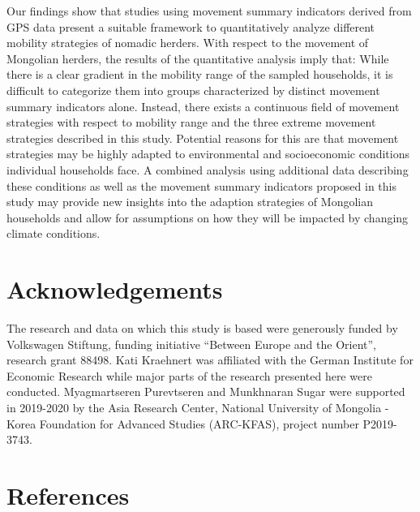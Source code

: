 \documentclass[]{elsarticle} %
\begin{document}
Our findings show that studies using movement summary indicators derived
from GPS data present a suitable framework to quantitatively analyze
different mobility strategies of nomadic herders. With respect to the
movement of Mongolian herders, the results of the quantitative analysis
imply that: While there is a clear gradient in the mobility range of the
sampled households, it is difficult to categorize them into groups
characterized by distinct movement summary indicators alone. Instead,
there exists a continuous field of movement strategies with respect to
mobility range and the three extreme movement strategies described in
this study. Potential reasons for this are that movement strategies may
be highly adapted to environmental and socioeconomic conditions
individual households face. A combined analysis using additional data
describing these conditions as well as the movement summary indicators
proposed in this study may provide new insights into the adaption
strategies of Mongolian households and allow for assumptions on how they
will be impacted by changing climate conditions.

\hypertarget{acknowledgements}{%
\section{Acknowledgements}\label{acknowledgements}}

The research and data on which this study is based were generously
funded by Volkswagen Stiftung, funding initiative ``Between Europe and
the Orient'', research grant 88498. Kati Kraehnert was affiliated with
the German Institute for Economic Research while major parts of the
research presented here were conducted. Myagmartseren Purevtseren and
Munkhnaran Sugar were supported in 2019-2020 by the Asia Research
Center, National University of Mongolia - Korea Foundation for Advanced
Studies (ARC-KFAS), project number P2019-3743.

\hypertarget{references}{%
\section*{References}\label{references}}
\end{document}

